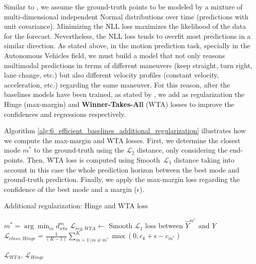 Similar to \cite{mercat2020multi}, we assume the ground-truth points to be modeled by a mixture of multi-dimensional independent Normal distributions over time (predictions with unit covariance). Minimizing the NLL loss maximizes the likelihood of the data for the forecast. Nevertheless, the NLL loss tends to overfit most predictions in a similar direction. As stated above, in the motion prediction task, specially in the Autonomous Vehicles field, we must build a model that not only reasons multimodal predictions in terms of different maneuvers (keep straight, turn right, lane change, etc.) but also different velocity profiles (constant velocity, acceleration, etc.) regarding the same maneuver. For this reason, after the baselines models have been trained, as stated by \cite{kim2022improving}, we add as regularization the Hinge (\aka max-margin) and \textbf{Winner-Takes-All} (WTA) \cite{liang2020learning, kim2022improving} losses to improve the confidences and regressions respectively. 

Algorithm \ref{alg:6_efficient_baselines_additional_regularization} illustrates how we compute the max-margin and WTA losses. First, we determine the closest mode $m^{*}$ to the ground-truth using the $\mathcal{L}_2$ distance, only considering the end-points. Then, WTA loss is computed using Smooth~$\mathcal{L}_1$ distance taking into account in this case the whole prediction horizon between the best mode and ground-truth prediction. Finally, we apply the max-margin loss regarding the confidence of the best mode and a margin ($\epsilon$).

\begin{algorithm}[H]
	\SetAlgoLined
	\caption{Additional regularization: Hinge and WTA loss}
	\label{alg:6_efficient_baselines_additional_regularization}
	
	
	
	
	
	$m^* = \arg\min_{m} d_{wta}^{m}$\;
	$\mathcal{L}_{reg,WTA} \gets $ Smooth $\mathcal{L}_1$ loss between $\hat{Y}^{m^*}$ and $Y$\;
	$\mathcal{L}_{class,Hinge} = \frac{1}{(K-1)}\sum_{m=1 \setminus m \neq m^*}^{K} \max( 0, c_{k} + \epsilon - c_{m^*})$\;
	
	\Return $\mathcal{L}_{WTA}$, $\mathcal{L}_{Hinge}$\;
	
\end{algorithm}

